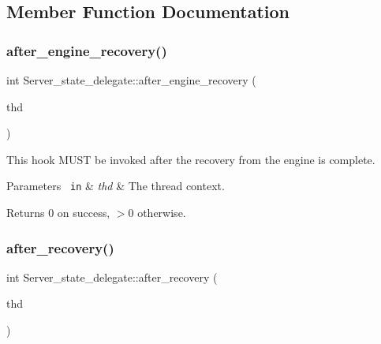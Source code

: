 \subsection{Member Function Documentation}
\mbox{\label{classServer__state__delegate_a770a99160c8bbc8fe97b28c53a972a50}} 
\subsubsection{\texorpdfstring{after\+\_\+engine\+\_\+recovery()}{after\_engine\_recovery()}}
{\footnotesize\ttfamily int Server\+\_\+state\+\_\+delegate\+::after\+\_\+engine\+\_\+recovery (\begin{DoxyParamCaption}\item[{T\+HD $\ast$}]{thd }\end{DoxyParamCaption})}

This hook M\+U\+ST be invoked after the recovery from the engine is complete.


\begin{DoxyParams}[1]{Parameters}
\mbox{\texttt{ in}}  & {\em thd} & The thread context. \\
\hline
\end{DoxyParams}
\begin{DoxyReturn}{Returns}
0 on success, $>$0 otherwise. 
\end{DoxyReturn}
\mbox{\label{classServer__state__delegate_a8d4a66660e9d9f463eb3719271cfffe8}} 
\subsubsection{\texorpdfstring{after\+\_\+recovery()}{after\_recovery()}}
{\footnotesize\ttfamily int Server\+\_\+state\+\_\+delegate\+::after\+\_\+recovery (\begin{DoxyParamCaption}\item[{T\+HD $\ast$}]{thd }\end{DoxyParamCaption})}

